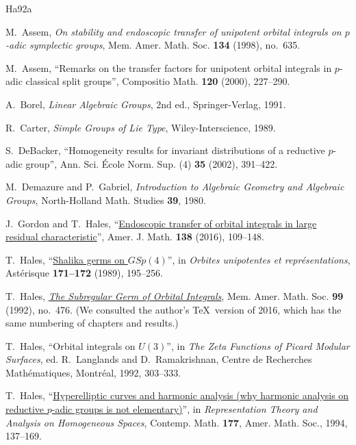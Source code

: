 \documentclass[12pt,letterpaper]{amsart}
\theoremstyle{plain}
\theoremstyle{definition}
\theoremstyle{remark}
\theoremstyle{definition}
\begin{document}
\begin{thebibliography}{Ha92a}

 M.~Assem, \textit{On stability and endoscopic transfer
of unipotent orbital integrals on $p$-adic symplectic groups}, Mem. Amer.
Math. Soc. \textbf{134} (1998), no.~635.

 M.~Assem, ``Remarks on the transfer factors for
unipotent orbital integrals in $p$-adic classical split groups'', Compositio
Math. \textbf{120} (2000), 227--290.

 A.~Borel, \textit{Linear Algebraic Groups}, 2nd ed.,
Springer-Verlag, 1991.

 R.~Carter, \textit{Simple Groups of Lie Type},
Wiley-Interscience, 1989.

 S.~DeBacker, ``Homogeneity results for invariant
distributions of a reductive $p$-adic group'', Ann. Sci. \'Ecole Norm. Sup.
(4) \textbf{35} (2002), 391--422.

 M.~Demazure and P.~Gabriel, \textit{Introduction to
Algebraic Geometry and Algebraic Groups}, North-Holland Math. Studies
\textbf{39}, 1980.

 J.~Gordon and T.~Hales, ``\href{https://muse.jhu.edu/article/609681/summary}{Endoscopic transfer of orbital
integrals in large residual characteristic}'', Amer. J. Math. \textbf{138}
(2016), 109--148.

 T.~Hales, ``\href{https://www.numdam.org/article/AST_1989__171-172__195_0.pdf}{Shalika germs on $GSp(4)$}'', in
\textit{Orbites unipotentes et repr\'esentations}, Ast\'erisque
\textbf{171--172} (1989), 195--256.

 T.~Hales, \href{https://iacobus.usc.gal/nde/fulldisplay/alma991013513907807712/34CISUG_USC:NDE/gl}{\textit{The Subregular Germ of Orbital
Integrals}}, Mem. Amer. Math. Soc. \textbf{99} (1992), no.~476. (We
consulted the author's \TeX\ version of 2016, which has the same numbering of
chapters and results.)

 T.~Hales, ``Orbital integrals on $U(3)$'', in
\textit{The Zeta Functions of Picard Modular Surfaces}, ed. R.~Langlands and
D.~Ramakrishnan, Centre de Recherches Math\'ematiques, Montr\'eal, 1992,
303--333.

 T.~Hales, ``\href{https://publicationsthomashales.wordpress.com/wp-content/uploads/2016/03/hyperelliptic-curves-harmonic-analysis-scan.pdf}{Hyperelliptic curves and harmonic analysis
(why harmonic analysis on reductive $p$-adic groups is not elementary)}'', in
\textit{Representation Theory and Analysis on Homogeneous Spaces},
Contemp. Math. \textbf{177}, Amer. Math. Soc., 1994, 137--169.


\end{thebibliography}
\end{document}
